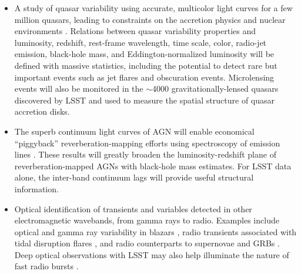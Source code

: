 \begin{itemize}
\item A study of quasar variability using accurate, multicolor light
  curves for a few million
quasars, leading to constraints on the accretion physics and nuclear environments \citep{2003AJ....126.1217D,2004ApJ...601..692V,2010ApJ...721.1014M,2017ApJ...836..186J}.
      Relations between quasar variability
      properties and luminosity, redshift,
      rest-frame wavelength, time scale, color, radio-jet emission, black-hole
      mass, and Eddington-normalized luminosity will be defined with massive
      statistics, including the potential to detect rare but important events such as
      jet flares and obscuration events. Microlensing events will also be monitored in the $\sim$4000 gravitationally-lensed
      quasars discovered by LSST and used to measure the spatial structure of quasar accretion disks.

\item The superb continuum light curves of AGN will enable economical ``piggyback''
      reverberation-mapping efforts using spectroscopy of emission lines
      \cite[e.g.,][]{2012ApJ...747...62C,2015ApJS..216....4S,2017ApJ...851...21G}. These results
      will greatly broaden the luminosity-redshift plane of reverberation-mapped AGNs
      with black-hole mass estimates. For LSST data alone, the inter-band continuum lags
      will provide useful structural information.

\item Optical identification of transients and variables detected in
  other electromagnetic wavebands, from gamma rays to radio. Examples
  include optical and gamma ray variability in blazars \citep{2014MNRAS.439..690H},
  radio transients associated with tidal disruption flares
  \citep{2011MNRAS.416.2102G}, and radio counterparts to supernovae and
  GRBs \citep{2006ApJ...639..331G}. Deep optical observations with LSST may
  also help illuminate the nature of fast radio bursts \cite[FRBs,][]{2007Sci...318..777L,2013Sci...341...53T}.


\end{itemize}
